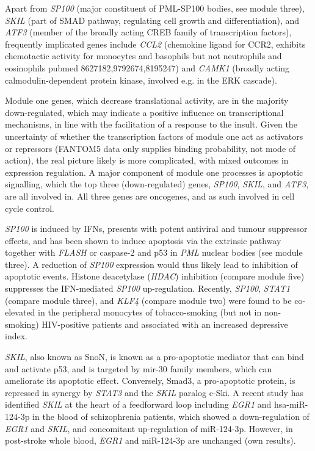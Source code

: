Apart from \emph{SP100} (major constituent of PML-SP100 bodies, see module three), \emph{SKIL} (part of SMAD pathway, regulating cell growth and differentiation), and \emph{ATF3} (member of the broadly acting CREB family of transcription factors), frequently implicated genes include \emph{CCL2} (chemokine ligand for CCR2, exhibits chemotactic activity for monocytes and basophils but not neutrophils and eosinophils pubmed 8627182,9792674,8195247) and \emph{CAMK1} (broadly acting calmodulin-dependent protein kinase, involved e.g. in the ERK cascade).

Module one genes, which decrease translational activity, are in the majority down-regulated, which may indicate a positive influence on transcriptional mechanisms, in line with the facilitation of a response to the insult. Given the uncertainty of whether the transcription factors of module one act as activators or repressors (FANTOM5 data only supplies binding probability, not mode of action), the real picture likely is more complicated, with mixed outcomes in expression regulation. A major component of module one processes is apoptotic signalling, which the top three (down-regulated) genes, \emph{SP100}, \emph{SKIL}, and \emph{ATF3}, are all involved in. All three genes are oncogenes, and as such involved in cell cycle control.

\emph{SP100} is induced by IFNs, presents with potent antiviral and tumour suppressor effects, and has been shown to induce apoptosis via the extrinsic pathway together with \emph{FLASH} or caspase-2 and p53 in \emph{PML} nuclear bodies (see module three).\cite{Sanchez-Pulido2007} A reduction of \emph{SP100} expression would thus likely lead to inhibition of apoptotic events. Histone deacetylase (\emph{HDAC}) inhibition (compare module five) suppresses the IFN-mediated \emph{SP100} up-regulation.\cite{Vlasakova2007} Recently, \emph{SP100}, \emph{STAT1} (compare module three), and \emph{KLF4} (compare module two) were found to be co-elevated in the peripheral monocytes of tobacco-smoking (but not in non-smoking) HIV-positive patients and associated with an increased depressive index.\cite{Lorenz2019}

\emph{SKIL}, also known as SnoN, is known as a pro-apoptotic mediator that can bind and activate p53, and is targeted by mir-30 family members, which can ameliorate its apoptotic effect.\cite{Kim2018} Conversely, Smad3, a pro-apoptotic protein, is repressed in synergy by \emph{STAT3} and the \emph{SKIL} paralog c-Ski.\cite{Makino2017} A recent study has identified \emph{SKIL} at the heart of a feedforward loop including \emph{EGR1} and hsa-miR-124-3p in the blood of schizophrenia patients, which showed a down-regulation of \emph{EGR1} and \emph{SKIL}, and concomitant up-regulation of miR-124-3p.\cite{Xu2016} However, in post-stroke whole blood, \emph{EGR1} and miR-124-3p are unchanged (own results).

